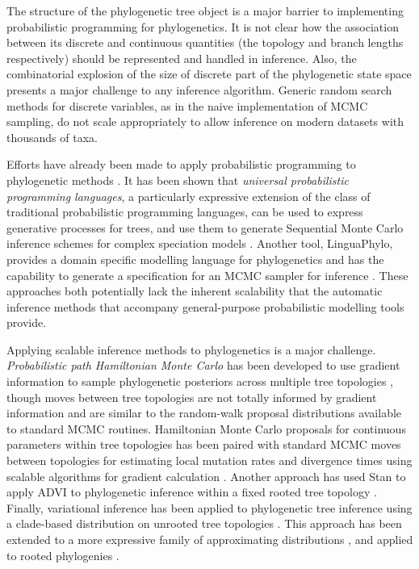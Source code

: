 The structure of the phylogenetic tree object is a major barrier to implementing probabilistic programming for phylogenetics. It is not clear how the association between its discrete and continuous quantities (the topology and branch lengths respectively) should be represented and handled in inference. Also, the combinatorial explosion of the size of discrete part of the phylogenetic state space presents a major challenge to any inference algorithm. Generic random search methods for discrete variables, as in the naive implementation of MCMC sampling, do not scale appropriately to allow inference on modern datasets with thousands of taxa.

Efforts have already been made to apply probabilistic programming to phylogenetic methods
\cite{fourment2019evaluating, ronquist2021universal, drummond2022linguaphylo}. It has been shown that \textit{universal probabilistic programming languages}, a particularly expressive extension of the class of traditional probabilistic programming languages, can be used to express generative processes for trees, and use them to generate Sequential Monte Carlo inference schemes for complex speciation models \cite{ronquist2021universal}. Another tool, LinguaPhylo, provides a domain specific modelling language for phylogenetics and has the capability to generate a specification for an MCMC sampler for inference \cite{drummond2022linguaphylo}. These approaches both potentially lack the inherent scalability that the automatic inference methods that accompany general-purpose probabilistic modelling tools provide.

Applying scalable inference methods to phylogenetics is a major challenge. \textit{Probabilistic path Hamiltonian Monte Carlo} has been developed to use gradient information to sample phylogenetic posteriors across multiple tree topologies \cite{dinh2017probabilistic}, though moves between tree topologies are not totally informed by gradient information and are similar to the random-walk proposal distributions available to standard MCMC routines. Hamiltonian Monte Carlo proposals for continuous parameters within tree topologies has been paired with standard MCMC moves between topologies for estimating local mutation rates and divergence times using scalable algorithms for gradient calculation \cite{ji2021scalable, fisher2021shrinkage}. Another approach has used Stan to apply ADVI to phylogenetic inference within a fixed rooted tree topology \cite{fourment2019evaluating}. Finally, variational inference has been applied to phylogenetic tree inference using a clade-based distribution on unrooted tree topologies \cite{zhang2018variational}. This approach has been extended to a more expressive family of approximating distributions \cite{zhang2020improved}, and applied to rooted phylogenies \cite{zhang2022variational}.

